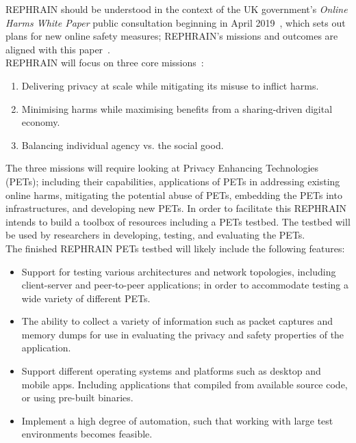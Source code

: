 \documentclass[
    author={Jacob Daniel Halsey},
    supervisor={Prof. Awais Rashid},
    degree={BSc},
    title={Building a Testbed for Evaluating Privacy Enhancing Technologies  (PETs)},
    subtitle={},
    type={software development},
    year={2021}
]{dissertation}
\begin{document}
REPHRAIN should be understood in the context of the UK government's \emph{Online Harms White Paper} public
consultation beginning in April 2019~\cite{uk_gov_online_harms}, which sets out plans for new online safety 
measures; REPHRAIN's missions and outcomes are aligned with this paper~\cite{rephrain_harms}. \\

REPHRAIN will focus on three core missions~\cite{rephrain_missions}:

\begin{enumerate}
	\item Delivering privacy at scale while mitigating its misuse to inflict harms.
	\item Minimising harms while maximising benefits from a sharing-driven digital economy.
	\item Balancing individual agency vs. the social good.
\end{enumerate}

The three missions will require looking at Privacy Enhancing Technologies (PETs); including their capabilities,
applications of PETs in addressing existing online harms, mitigating the potential abuse of PETs, embedding the PETs
into infrastructures, and developing new PETs.
In order to facilitate this REPHRAIN intends to build a toolbox of resources including a PETs testbed. The testbed
will be used by researchers in developing, testing, and evaluating the PETs.\\

The finished REPHRAIN PETs testbed will likely include the following features:

\begin{itemize}
	\item Support for testing various architectures and network topologies, 
	including client-server and peer-to-peer applications; in order to accommodate 
	testing a wide variety of different PETs.
	\item The ability to collect a variety of information such as packet captures and memory dumps
	for use in evaluating the privacy and safety properties of the application.
	\item Support different operating systems and platforms such as desktop and mobile apps.
	Including applications that compiled from available source code, or using pre-built binaries.
	\item Implement a high degree of automation, such that working with large test
	environments becomes feasible.
\end{itemize}
\end{document}

